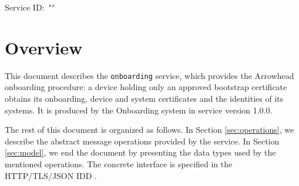 \documentclass[a4paper]{arrowhead}
\begin{document}
\sloppy

\ArrowheadSetup

\begin{center}
  \vspace*{1cm}
  \huge{\arrowtitle}

  \vspace*{0.2cm}
  \LARGE{\arrowtype}
  \vspace*{1cm}

  \Large{Service ID: \textit{"\arrowid"}}

  \vspace*{\fill}


  \vspace*{1cm}
  \vspace*{\fill}

  \begin{abstract}
    This document describes the \texttt{onboarding} service, version 1.0.0, produced by the Onboarding support system of Arrowhead 5.2.2.
  \end{abstract}

  \vspace*{1cm}
\end{center}

\newpage

\tableofcontents
\newpage

\section{Overview}
\label{sec:overview}

This document describes the \texttt{onboarding} service, which provides the Arrowhead onboarding procedure: a device holding only an approved bootstrap certificate obtains its onboarding, device and system certificates and the identities of its systems.
It is produced by the Onboarding system \cite{onb-sysd} in service version 1.0.0.

The rest of this document is organized as follows.
In Section \ref{sec:operations}, we describe the abstract message operations provided by the service.
In Section \ref{sec:model}, we end the document by presenting the data types used by the mentioned operations.
The concrete interface is specified in the HTTP/TLS/JSON IDD \cite{onb-onboarding-http-idd}.
\end{document}
